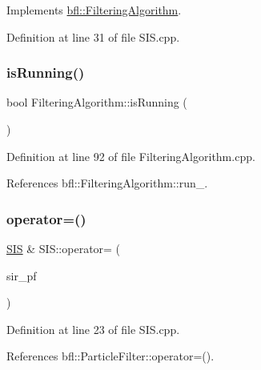 Implements \mbox{\hyperlink{classbfl_1_1FilteringAlgorithm_af2a072aa51407fe5544bdbb7ce466e2a}{bfl\+::\+Filtering\+Algorithm}}.



Definition at line 31 of file S\+I\+S.\+cpp.

\mbox{\label{classbfl_1_1FilteringAlgorithm_a5cfecab2c778620e2557237472bb1721}} 
\subsubsection{\texorpdfstring{is\+Running()}{isRunning()}}
{\footnotesize\ttfamily bool Filtering\+Algorithm\+::is\+Running (\begin{DoxyParamCaption}{ }\end{DoxyParamCaption})\hspace{0.3cm}{\ttfamily [inherited]}}



Definition at line 92 of file Filtering\+Algorithm.\+cpp.



References bfl\+::\+Filtering\+Algorithm\+::run\+\_\+.

\mbox{\label{classbfl_1_1SIS_a32458a24446df8126ace63f21de2bf02}} 
\subsubsection{\texorpdfstring{operator=()}{operator=()}}
{\footnotesize\ttfamily \mbox{\hyperlink{classbfl_1_1SIS}{S\+IS}} \& S\+I\+S\+::operator= (\begin{DoxyParamCaption}\item[{\mbox{\hyperlink{classbfl_1_1SIS}{S\+IS}} \&\&}]{sir\+\_\+pf }\end{DoxyParamCaption})\hspace{0.3cm}{\ttfamily [noexcept]}}



Definition at line 23 of file S\+I\+S.\+cpp.



References bfl\+::\+Particle\+Filter\+::operator=().

